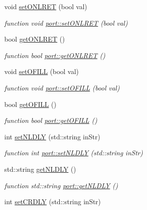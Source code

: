 \begin{DoxyCompactItemize}
void \hyperlink{classport_ad68aa35b00421eb9a30e246bdbb8ddb8}{set\+O\+N\+L\+R\+ET} (bool val)
\begin{DoxyCompactList}\small\item\em function void \hyperlink{classport_ad68aa35b00421eb9a30e246bdbb8ddb8}{port\+::set\+O\+N\+L\+R\+ET} (bool val) \end{DoxyCompactList}\item 
bool \hyperlink{classport_a4c5aa09daf221a9409e91b279da17669}{get\+O\+N\+L\+R\+ET} ()
\begin{DoxyCompactList}\small\item\em function bool \hyperlink{classport_a4c5aa09daf221a9409e91b279da17669}{port\+::get\+O\+N\+L\+R\+ET} () \end{DoxyCompactList}\item 
void \hyperlink{classport_a38f6eec5e22daede6d707d6ca4a29784}{set\+O\+F\+I\+LL} (bool val)
\begin{DoxyCompactList}\small\item\em function void \hyperlink{classport_a38f6eec5e22daede6d707d6ca4a29784}{port\+::set\+O\+F\+I\+LL} (bool val) \end{DoxyCompactList}\item 
bool \hyperlink{classport_a087e732d81656583ce7430727263149a}{get\+O\+F\+I\+LL} ()
\begin{DoxyCompactList}\small\item\em function bool \hyperlink{classport_a087e732d81656583ce7430727263149a}{port\+::get\+O\+F\+I\+LL} () \end{DoxyCompactList}\item 
int \hyperlink{classport_a2a2bc570ded985a9f5a7807974a955ba}{set\+N\+L\+D\+LY} (std\+::string in\+Str)
\begin{DoxyCompactList}\small\item\em function int \hyperlink{classport_a2a2bc570ded985a9f5a7807974a955ba}{port\+::set\+N\+L\+D\+LY} (std\+::string in\+Str) \end{DoxyCompactList}\item 
std\+::string \hyperlink{classport_aae2ce70c879b30f001563968a1ef5a34}{get\+N\+L\+D\+LY} ()
\begin{DoxyCompactList}\small\item\em function std\+::string \hyperlink{classport_aae2ce70c879b30f001563968a1ef5a34}{port\+::get\+N\+L\+D\+LY} () \end{DoxyCompactList}\item 
int \hyperlink{classport_afca1f60b0977cd228f12a8ef4c771fc4}{set\+C\+R\+D\+LY} (std\+::string in\+Str)

\end{DoxyCompactItemize}
